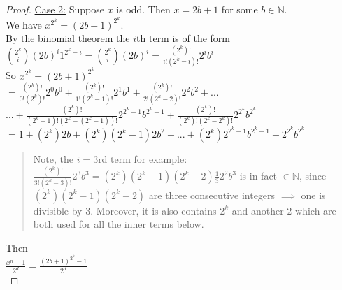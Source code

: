 \documentclass{article}
\begin{document}
\begin{flushleft}
\begin{proof}
        \vspace{.1in}

        \underline{Case 2:} Suppose $x$ is odd. Then $x=2b+1$ for some $b\in{\mathbb{N}}$.\\\vspace{.05in}
        We have $x^{2^k}=(2b+1)^{2^k}$. \\\vspace{.05in}
        By the binomial theorem the $i$th term is of the form\\\vspace{.05in}
        \hspace{.2in} $\displaystyle{2^k \choose i}(2b)^i1^{2^k-i}={2^k \choose i}(2b)^i=\frac{(2^k)!}{i!(2^k-i)!}2^ib^i$\\\vspace{.05in}
        So $x^{2^k}=(2b+1)^{2^k}$ \\\vspace{.05in}
        \hspace{.39in} $\displaystyle=\frac{(2^k)!}{0!(2^k)!}2^0b^0+\frac{(2^k)!}{1!(2^k-1)!}2^1b^1+\frac{(2^k)!}{2!(2^k-2)!}2^2b^2+...$\\
        \hspace{.55in} $\displaystyle...+\frac{(2^k)!}{(2^k-1)!(2^k-(2^k-1))!}2^{2^k-1}b^{2^k-1}+\frac{(2^k)!}{(2^k)!(2^k-2^k)!}2^{2^k}b^{2^k}$\\\vspace{.05in}
        \hspace{.39in} $\displaystyle=1+(2^k)2b+(2^k)(2^k-1)2b^2+...+(2^k)2^{2^k-1}b^{2^k-1}+2^{2^k}b^{2^k}$\\\vspace{.05in}
        \begin{quote}
            Note, the $i=3$rd term for example: $\frac{(2^k)!}{3!(2^k-3)!}2^3b^3=(2^k)(2^k-1)(2^k-2)\frac{1}{3}2^2b^3$ is in fact $\in\mathbb{N}$, since $(2^k)(2^k-1)(2^k-2)$ are three consecutive integers $\implies$ one is divisible by 3. Moreover, it is also contains $2^k$ and another $2$ which are both used for all the inner terms below. \\\vspace{.05in}
        \end{quote}
        Then\\\vspace{.05in}
        \hspace{.2in} $\displaystyle\frac{x^n-1}{2^d}=\frac{(2b+1)^{2^k}-1}{2^d}$\\\vspace{.05in}

\end{proof}
\end{flushleft}
\end{document}
